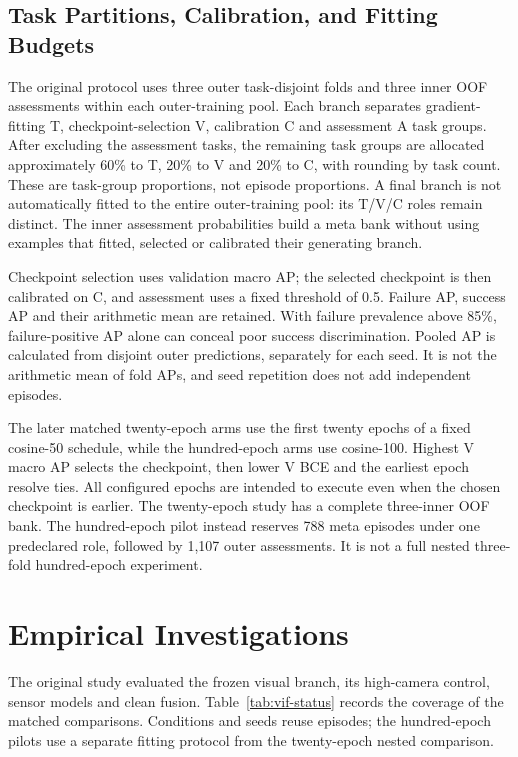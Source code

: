 \subsection{Task Partitions, Calibration, and Fitting Budgets}
The original protocol uses three outer task-disjoint folds and three inner OOF
assessments within each outer-training pool. Each branch separates gradient-fitting T,
checkpoint-selection V, calibration C and assessment A task groups. After excluding the
assessment tasks, the remaining task groups are allocated approximately 60\% to T,
20\% to V and 20\% to C, with rounding by task count. These are task-group proportions,
not episode proportions. A final branch is not automatically fitted to the entire
outer-training pool: its T/V/C roles remain distinct. The inner assessment probabilities
build a meta bank without using examples that fitted, selected or calibrated their
generating branch.

Checkpoint selection uses validation macro AP; the selected checkpoint is then
calibrated on C, and assessment uses a fixed threshold of 0.5. Failure AP, success AP
and their arithmetic mean are retained. With failure prevalence above 85\%,
failure-positive AP alone can conceal poor success discrimination. Pooled AP is
calculated from disjoint outer predictions, separately for each seed. It is not the
arithmetic mean of fold APs, and seed repetition does not add independent episodes.

The later matched twenty-epoch arms use the first twenty epochs of a fixed cosine-50
schedule, while the hundred-epoch arms use cosine-100. Highest V macro AP selects the
checkpoint, then lower V BCE and the earliest epoch resolve ties. All configured epochs
are intended to execute even when the chosen checkpoint is earlier. The twenty-epoch
study has a complete three-inner OOF bank. The hundred-epoch pilot instead reserves 788
meta episodes under one predeclared role, followed by 1,107 outer assessments. It is not
a full nested three-fold hundred-epoch experiment.

\section{Empirical Investigations}
The original study evaluated the frozen visual branch, its high-camera control, sensor
models and clean fusion. Table~\ref{tab:vif-status} records the coverage of the matched
comparisons. Conditions and seeds reuse episodes; the hundred-epoch pilots use a separate
fitting protocol from the twenty-epoch nested comparison.

